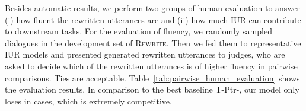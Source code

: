 \documentclass[11pt,a4paper]{article}
\begin{document}
Besides automatic results, we perform two groups of human evaluation to answer (i) how fluent the rewritten utterances are and (ii) how much IUR can contribute to downstream tasks. For the evaluation of fluency, we randomly sampled  dialogues in the development set of \textsc{Rewrite}. Then we fed them to representative IUR models and presented generated rewritten utterances to  judges, who are asked to decide which of the rewritten utterances is of higher fluency in pairwise comparisons. Ties are acceptable. Table~\ref{tab:pairwise_human_evaluation} shows the evaluation results. In comparison to the best baseline T-Ptr-, our model only loses in  cases, which is extremely competitive.

\begin{table}[t]
    \centering
    \caption{The inference speed comparison between RUN and baselines. Beam stands for the beam size in beam search, not applicable for RUN. Latency is computed as the time to produce a single sentence without data batching, averaged over the development set of \textsc{Rewrite}. All models are implemented in PyTorch on a single NVIDIA V100.}
    \label{tab:inferece_speed}
\end{table}
\end{document}
